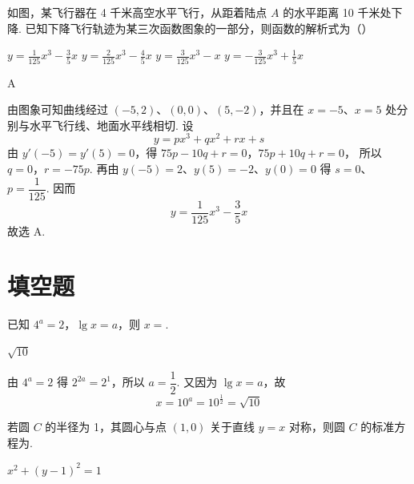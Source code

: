 \begin{problem}
如图，某飞行器在 4 千米高空水平飞行，从距着陆点 \(A\) 的水平距离 10 千米处下降. 已知下降飞行轨迹为某三次函数图象的一部分，则函数的解析式为（\quad）


\choices
    {\( y = \frac{1}{125} x^3 - \frac{3}{5} x \)}
    {\( y = \frac{2}{125} x^3 - \frac{4}{5} x \)}
    {\( y = \frac{3}{125} x^3 - x \)}
    {\( y = -\frac{3}{125} x^3 + \frac{1}{5} x \)}
\end{problem}

\begin{answer}
A
\end{answer}

\begin{solution}
由图象可知曲线经过 \((-5,2)\)、\((0,0)\)、\((5,-2)\)，并且在 \(x=-5\)、\(x=5\) 处分别与水平飞行线、地面水平线相切. 设
\[
y=px^{3}+qx^{2}+rx+s
\]
由 \(y'(-5)=y'(5)=0\)，得
\(75p-10q+r=0\)，\(75p+10q+r=0\)，
所以 \(q=0\)，\(r=-75p\). 再由 \(y(-5)=2\)、\(y(5)=-2\)、\(y(0)=0\) 得 \(s=0\)、\(p=\dfrac{1}{125}\). 因而
\[
y=\frac{1}{125}x^{3}-\frac{3}{5}x
\]
故选 A.
\end{solution}

\section{填空题}

\begin{problem}
已知 \(4^{a} = 2\)，\(\lg x = a\)，则 \(x =\)\fillinblank{}.
\end{problem}

\begin{answer}
\(\sqrt{10}\)
\end{answer}

\begin{solution}
由 \(4^a=2\) 得 \(2^{2a}=2^1\)，所以 \(a=\dfrac12\). 又因为 \(\lg x=a\)，故
\[
x=10^a=10^{\frac12}=\sqrt{10}
\]
\end{solution}

\begin{problem}
若圆 \(C\) 的半径为 1，其圆心与点 \((1,0)\) 关于直线 \(y = x\) 对称，则圆 \(C\) 的标准方程为\fillinblank{}.
\end{problem}

\begin{answer}
\(x^2 + (y - 1)^2 = 1\)
\end{answer}

